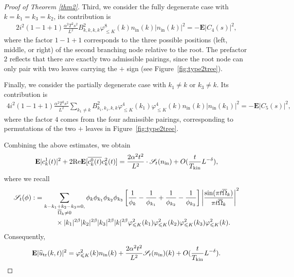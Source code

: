 \documentclass[UTF-8,reqno]{amsart}
\numberwithin{equation}{section}
\theoremstyle{definition}
\def\leq{\leqslant}
\def\leq{\leqslant}
\begin{document}
\begin{proof}[Proof of Theorem \ref{thm2}]
Third, we consider the fully degenerate case with  $k= k_1=k_3=k_2$, its contribution is 
\begin{align*}
   2i^2(1-1+1)\frac{\alpha^2 T^2s^2}{L^{2}}B^2_{k,k,k,k}\varphi_{\leq K}^8(k)n_{\mathrm{in}}(k)|n_{\mathrm{in}}(k)|^2=-\mathbf{E}|C_4(s)|^2,
\end{align*}
where the factor $1-1+1$ corresponds to the three possible positions (left, middle, or right) of the second branching node relative to the root. The prefactor $2$ reflects that there are exactly two admissible pairings, since the root node can only pair with two leaves carrying the $+$ sign (see Figure~\ref{fig:type2tree}).
 

Finally, we consider the partially degenerate case with $k_1\neq k$ or $k_3\neq k$. Its contribution is
\begin{align*}
    4i^2(1-1+1)\frac{\alpha^2 T^2s^2}{L^{2}}\sum_{k_1\neq k}B^2_{k_1,k_1,k,k}\varphi_{\leq K}^4(k_1)\varphi_{\leq K}^4(k)n_{\mathrm{in}}(k)|n_{\mathrm{in}}(k_1)|^2=-\mathbf{E}|C_5(s)|^2,
\end{align*}
where the factor $4$ comes from the four admissible pairings, corresponding to permutations of the two $+$ leaves in Figure~\ref{fig:type2tree}.
 




Combining the above estimates, we obtain
\begin{align*}\mathbf{E}|c^1_k(t)|^2+2\mathrm{Re}\mathbf{E}[\overline{c^0_k(t)}c^2_k(t)]=\frac{2\alpha^2t^2}{L^{2}}\cdot\mathscr{S}_{t}(n_{\mathrm{in}}) +O(\frac{t}{T_{\rm kin}}L^{-\delta}),\end{align*} where we recall  \begin{align*}
 \mathscr S_t(\phi):&=\sum\limits_{\substack{ k-k_1+k_2-k_3=0,\\ \overline \Omega_k\neq0}}\phi_k \phi_{k_1} \phi_{k_2} \phi_{k_3}  \left[ \frac{1}{\phi_k} - \frac{1}{\phi_{k_1}} + \frac{1}{\phi_{k_2}} - \frac{1}{\phi_{k_3}} \right]\left| \frac{\sin(\pi t\overline \Omega_k)}{\pi t \overline \Omega_k} \right|^2\notag\\
  &\quad\quad\quad\times
|k_1|^{2\beta}|k_2|^{2\beta}|k_3|^{2\beta}|k|^{2\beta}\varphi_{\leq K}^2(k_1)\varphi_{\leq K}^2(k_2)\varphi_{\leq K}^2(k_3)\varphi_{\leq K}^2(k).
\end{align*} 
Consequently,
\begin{align*}\mathbf{E}|\widehat{u}_{\rm tr}(k,t)|^2=\varphi_{\leq K}^2(k)n_{\mathrm{in}}(k)+\frac{2\alpha^2t^2}{L^{2}}\mathscr{S}_{t}(n_{\mathrm{in}})(k)+O(\frac{t}{T_{\rm kin}}L^{-\delta }).\end{align*}


\end{proof}
\end{document}
